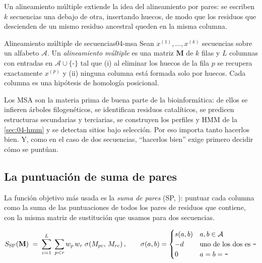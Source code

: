 Un alineamiento múltiple extiende la idea del alineamiento por pares: se escriben $k$ secuencias una debajo de otra, insertando huecos, de modo que los residuos que descienden de un mismo residuo ancestral queden en la misma columna.

\begin{definicion}{Alineamiento múltiple de secuencias}{04-msa}
Sean $x^{(1)},\dots,x^{(k)}$ secuencias sobre un alfabeto $\mathcal{A}$. Un \emph{alineamiento múltiple} es una matriz $\mathbf{M}$ de $k$ filas y $L$ columnas con entradas en $\mathcal{A}\cup\{\texttt{-}\}$ tal que (i) al eliminar los huecos de la fila $p$ se recupera exactamente $x^{(p)}$ y (ii) ninguna columna está formada solo por huecos. Cada columna es una hipótesis de homología posicional.
\end{definicion}

Los MSA son la materia prima de buena parte de la bioinformática: de ellos se infieren árboles filogenéticos, se identifican residuos catalíticos, se predicen estructuras secundarias y terciarias, se construyen los perfiles y HMM de la \cref{sec:04-hmm} y se detectan sitios bajo selección. Por eso importa tanto hacerlos bien. Y, como en el caso de dos secuencias, ``hacerlos bien'' exige primero decidir cómo se puntúan.

\subsection{La puntuación de suma de pares}

La función objetivo más usada es la \emph{suma de pares} (SP, ): puntuar cada columna como la suma de las puntuaciones de todos los pares de residuos que contiene, con la misma matriz de sustitución que usamos para dos secuencias.

\begin{equation}\label{eq:04-sp}
S_{\mathrm{SP}}(\mathbf{M}) \;=\; \sum_{c=1}^{L}\;\sum_{p<r} w_p\,w_r\;\sigma\!\left(M_{pc},\,M_{rc}\right),
\qquad
\sigma(a,b)=\begin{cases}
s(a,b) & a,b\in\mathcal{A}\\
-d & \text{uno de los dos es \texttt{-}}\\
0 & a=b=\texttt{-}
\end{cases}
\end{equation}

\begin{simbolos}
\end{simbolos}

